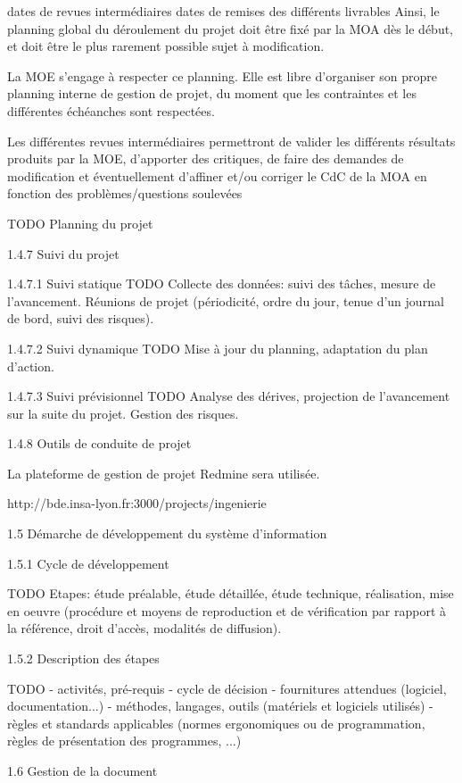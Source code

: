 dates de revues intermédiaires
dates de remises des différents livrables
Ainsi, le planning global du déroulement du projet doit être fixé par la MOA dès le début, et doit être le plus rarement possible sujet à modification.

La MOE s'engage à respecter ce planning. Elle est libre d'organiser son propre planning interne de gestion de projet, du moment que les contraintes et les différentes échéanches sont respectées.

Les différentes revues intermédiaires permettront de valider les différents résultats produits par la MOE, d'apporter des critiques, de faire des demandes de modification et éventuellement d'affiner et/ou corriger le CdC de la MOA en fonction des problèmes/questions soulevées

TODO Planning du projet

1.4.7   Suivi du projet

1.4.7.1   Suivi statique
TODO Collecte des données: suivi des tâches, mesure de l'avancement. Réunions de projet (périodicité, ordre du jour, tenue d'un journal de bord, suivi des risques).

1.4.7.2   Suivi dynamique
TODO Mise à jour du planning, adaptation du plan d'action.

1.4.7.3   Suivi prévisionnel
TODO Analyse des dérives, projection de l'avancement sur la suite du projet. Gestion des risques.

1.4.8   Outils de conduite de projet

La plateforme de gestion de projet Redmine sera utilisée.

http://bde.insa-lyon.fr:3000/projects/ingenierie

1.5   Démarche de développement du système d'information

1.5.1   Cycle de développement

TODO Etapes: étude préalable, étude détaillée, étude technique, réalisation, mise en oeuvre (procédure et moyens de reproduction et de vérification par rapport à la référence, droit d'accès, modalités de diffusion).

1.5.2   Description des étapes

TODO - activités, pré-requis - cycle de décision - fournitures attendues (logiciel, documentation...) - méthodes, langages, outils (matériels et logiciels utilisés) - règles et standards applicables (normes ergonomiques ou de programmation, règles de présentation des programmes, ...)

1.6   Gestion de la document

